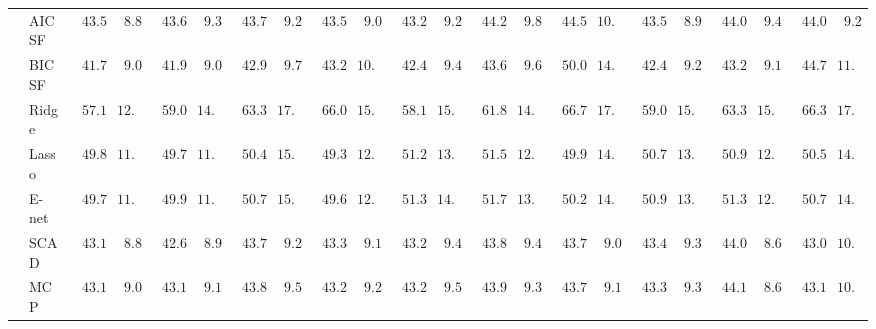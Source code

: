 \begin{tabular}{ll|ll|llllll|llllll|llllll}
 & AIC SF  & $\phantom{0}43.53$ & $\phantom{0}8.89$ & $\phantom{0}43.69$ & $\phantom{0}9.35$ & $\phantom{0}43.76$ & $\phantom{0}9.24$ & $\phantom{0}43.58$ & $\phantom{0}9.04$ & $\phantom{0}43.26$ & $\phantom{0}9.24$ & $\phantom{0}44.29$ & $\phantom{0}9.83$ & $\phantom{0}44.59$ & $10.71$ & $\phantom{0}43.53$ & $\phantom{0}8.95$ & $\phantom{0}44.09$ & $\phantom{0}9.42$ & $\phantom{0}44.03$ & $\phantom{0}9.23$ \\
 & BIC SF  & $\phantom{0}41.72$ & $\phantom{0}9.09$ & $\phantom{0}41.98$ & $\phantom{0}9.00$ & $\phantom{0}42.93$ & $\phantom{0}9.78$ & $\phantom{0}43.25$ & $10.50$ & $\phantom{0}42.43$ & $\phantom{0}9.41$ & $\phantom{0}43.60$ & $\phantom{0}9.63$ & $\phantom{0}50.08$ & $14.76$ & $\phantom{0}42.46$ & $\phantom{0}9.20$ & $\phantom{0}43.25$ & $\phantom{0}9.18$ & $\phantom{0}44.70$ & $11.92$ \\
 & Ridge  & $\phantom{0}57.10$ & $12.52$ & $\phantom{0}59.04$ & $14.93$ & $\phantom{0}63.31$ & $17.65$ & $\phantom{0}66.07$ & $15.44$ & $\phantom{0}58.14$ & $15.81$ & $\phantom{0}61.86$ & $14.53$ & $\phantom{0}66.75$ & $17.06$ & $\phantom{0}59.05$ & $15.22$ & $\phantom{0}63.33$ & $15.43$ & $\phantom{0}66.31$ & $17.89$ \\
 & Lasso  & $\phantom{0}49.81$ & $11.71$ & $\phantom{0}49.71$ & $11.93$ & $\phantom{0}50.42$ & $15.09$ & $\phantom{0}49.32$ & $12.76$ & $\phantom{0}51.21$ & $13.98$ & $\phantom{0}51.53$ & $12.83$ & $\phantom{0}49.91$ & $14.84$ & $\phantom{0}50.70$ & $13.98$ & $\phantom{0}50.96$ & $12.09$ & $\phantom{0}50.52$ & $14.55$ \\
 & E-net  & $\phantom{0}49.78$ & $11.75$ & $\phantom{0}49.91$ & $11.82$ & $\phantom{0}50.79$ & $15.58$ & $\phantom{0}49.60$ & $12.82$ & $\phantom{0}51.38$ & $14.04$ & $\phantom{0}51.78$ & $13.08$ & $\phantom{0}50.20$ & $14.89$ & $\phantom{0}50.95$ & $13.91$ & $\phantom{0}51.30$ & $12.26$ & $\phantom{0}50.70$ & $14.58$ \\
 & SCAD  & $\phantom{0}43.13$ & $\phantom{0}8.80$ & $\phantom{0}42.60$ & $\phantom{0}8.91$ & $\phantom{0}43.78$ & $\phantom{0}9.28$ & $\phantom{0}43.31$ & $\phantom{0}9.13$ & $\phantom{0}43.26$ & $\phantom{0}9.40$ & $\phantom{0}43.88$ & $\phantom{0}9.43$ & $\phantom{0}43.79$ & $\phantom{0}9.06$ & $\phantom{0}43.49$ & $\phantom{0}9.32$ & $\phantom{0}44.06$ & $\phantom{0}8.60$ & $\phantom{0}43.07$ & $10.14$ \\
 & MCP  & $\phantom{0}43.11$ & $\phantom{0}9.06$ & $\phantom{0}43.16$ & $\phantom{0}9.11$ & $\phantom{0}43.81$ & $\phantom{0}9.56$ & $\phantom{0}43.21$ & $\phantom{0}9.29$ & $\phantom{0}43.23$ & $\phantom{0}9.54$ & $\phantom{0}43.93$ & $\phantom{0}9.38$ & $\phantom{0}43.78$ & $\phantom{0}9.17$ & $\phantom{0}43.31$ & $\phantom{0}9.32$ & $\phantom{0}44.16$ & $\phantom{0}8.66$ & $\phantom{0}43.18$ & $10.33$ \\

\end{tabular}
